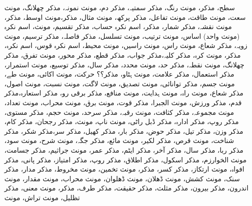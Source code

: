 سطح، مذکر، مونث
رنگ، مذکر
سمتیہ، مذکر
دم، مونث
نمونہ، مذکر
چھلانگ، مونث
سعت، مونث
طاقت، مونث
تفاعل، مذکر
پرکھ، مونث
مثال، مذکر،مونث
اوسط، مذکر، مونث
نقشہ، مذکر
شمار، مذکر، اسم نکرہ
حساب، مذکر
تقسیم، مونث، اسم نکرہ (مونث واحد)
اساس، مونث
ترتیب، مونث
تسلسل، مذکر
فاصلہ، مذکر
ترسیم، مونث
زویہ، مذکر
شعاع، مونث
راس، مونث
راسیں، مونث
محیط، اسم نکرہ
قوس، اسم نکرہ، مذکر، مونث
کرہ، مذکر
کلیہ،مذکر
جواب، مذکر
قطع، مذکر
محور، مونث
تفرق، مذکر
چھلانگ، مونث
نقطہ، مذکر
حد، مونث
محدد، مذکر
سال، مذکر
توسیع، مونث
استمرار، مذکر
استعمال، مذکر
علامت، مونث
ہٹاو، مذکر؟؟
حرکت، مونث
اکائی، مونث
طے، مونث
جسم، مذکر
توانائی، مونث
تصدیق، مونث
لاگت، مونث
نسبت، مونث
اصول، مذکر
شعاع، مونث
راہ، مونث
ہدایت، مونث
منافع، مذکر
برقی رو، مذکر
استعارہ،مذکر
قدم، مذکر
ورزش، مونث
الجبرا، مذکر
قوت، مونث
برق، مونث
محراب، مونث
تعداد، مونث
مجموعہ، مذکر
کثافت، مونث
رقبہ، مذکر
سرحد، مونث
حجم، مذکر
مستوی، مذکر
روپ، مذکر
ادارہ، مذکر
ڈبل راٹی، مونث
ناپ، مونث، مذکر
رجحان، مذکر
کام، مذکر
وزن، مذکر
تیل، مذکر
حوض، مذکر
بار، مذکر
کھیل، مذکر
سر،مذکر
شکر، مذکر
شناخت، مونث
 قرص، مذکر
لکیر، مونث
مائع، مذکر
جگہ، مونث
شرح، مونث
سود، مذکر
ربا، مذکر
سال، مذکر
آخر، مذکر
ایٹم، مذکر
عمر، مونث
جراثیم، مذکر
جسامت، مونث
الخوارزم، مذکر
اسکول، مذکر
اطلاق، مذکر
روپ، مذکر
امتیاز، مذکر
پانی، مذکر
افواہ، مونث
ارتکاز، مذکر
کسر، مذکر، مونث
تخمین، مونث
مخروط، مذکر
مدار، مذکر
سنک، مونث
کشش، مونث
ڈھلان، مونث
ڈھلوان، مونث
محراب، مونث
مقدار، مونث
اندرون، مذکر
بیرون، مذکر
مثلث، مذکر
حقیقت، مذکر
طرف، مذکر، مونث
معنی، مذکر
تظلیل، مونث
تراش، مونث

